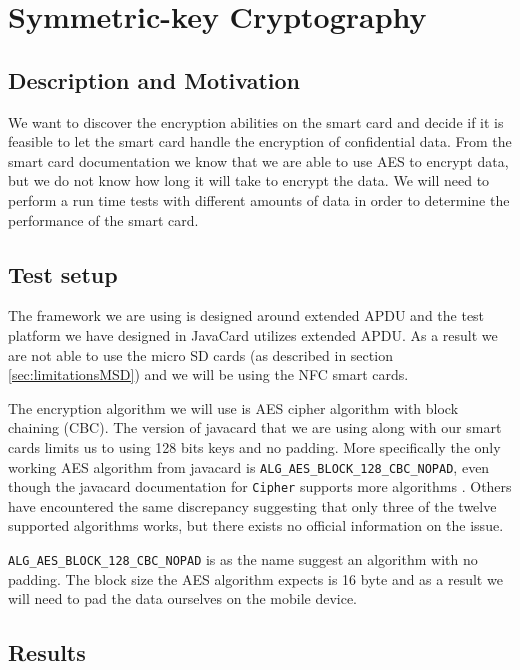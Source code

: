 \section{Symmetric-key Cryptography}
\label{sec:symmetricTest}
\subsection{Description and Motivation}
We want to discover the encryption abilities on the smart card and decide if it is feasible to let the smart card handle the encryption of confidential data. From the smart card documentation we know that we are able to use AES to encrypt data, but we do not know how long it will take to encrypt the data. We will need to perform a run time tests with different amounts of data in order to determine the performance of the smart card.

\subsection{Test setup}
The framework we are using is designed around extended APDU and the test platform we have designed in JavaCard utilizes extended APDU. As a result we are not able to use the micro SD cards (as described in section \ref{sec:limitationsMSD}) and we will be using the NFC smart cards.

The encryption algorithm we will use is AES cipher algorithm with block chaining (CBC). The version of javacard that we are using along with our smart cards limits us to using 128 bits keys and no padding. More specifically the only working AES algorithm from javacard is \texttt{ALG\_AES\_BLOCK\_128\_CBC\_NOPAD}, even though the javacard documentation for \texttt{Cipher} supports more algorithms \cite{javacardCipher}. Others have encountered the same discrepancy \cite{javacardCipherFail} suggesting that only three of the twelve supported algorithms works, but there exists no official information on the issue.

\texttt{ALG\_AES\_BLOCK\_128\_CBC\_NOPAD} is as the name suggest an algorithm with no padding. The block size the AES algorithm expects is 16 byte and as a result we will need to pad the data ourselves on the mobile device.

\subsection{Results}


